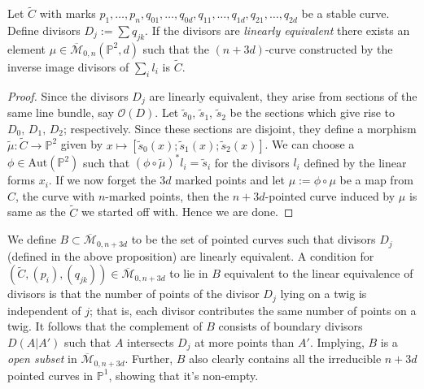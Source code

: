 \begin{proposition}
    Let $\tilde{C}$ with marks $p_{1},\allowbreak \dots,\allowbreak p_{n},\allowbreak q_{01},\allowbreak \dots,\allowbreak q_{0d} ,\allowbreak q_{11},\allowbreak \dots,\allowbreak q_{1d},\allowbreak q_{21},\allowbreak \dots,\allowbreak q_{2d}$ be a stable curve.
    Define divisors $D_{j}:= \sum q_{jk}$.
    If the divisors are \textit{linearly equivalent} there exists an element $\mu \in \overline{\mathcal{M}}_{0,n}(\mathbb{P}^{2},d)$ such that the $(n+3d)$-curve constructed by the inverse image divisors of $\sum_{i}l_{i}$ is $\tilde{C}$.
\end{proposition}
\begin{proof}
    Since the divisors $D_{j}$ are linearly equivalent, they arise from sections of the same line bundle, say $\mathcal{O}(D)$.
    Let $\tilde{s}_{0},\, \tilde{s}_{1},\,\tilde{s}_{2}$ be the sections which give rise to $D_{0},\,\allowbreak D_{1},\,\allowbreak D_{2}$; respectively.
    Since these sections are disjoint, they define a morphism $\tilde{\mu}: \tilde C \to \mathbb{P}^{2}$ given by $x \mapsto [\tilde{s}_{0}(x);\tilde{s}_{1}(x);\tilde{s}_{2}(x)]$.
    We can choose a $\phi \in \text{Aut}(\mathbb{P}^{2})$ such that $(\phi \circ \tilde{\mu})^{*}l_{i} = \tilde{s}_{i}$ for the divisors $l_{i}$ defined by the linear forms $x_{i}$.
    If we now forget the $3d$ marked points and let $\mu := \phi \circ \mu$ be a map from $C$, the curve with $n$-marked points, then the $n+3d$-pointed curve induced by $\mu$ is same as the $\tilde{C}$ we started off with.
    Hence we are done.
\end{proof}

\begin{remark}
    We define $B \subset \overline{\mathcal{M}}_{0,n+3d}$ to be the set of pointed curves such that divisors $D_{j}$ (defined in the above proposition) are linearly equivalent. 
    A condition for $(\tilde C, (p_{i}), (q_{jk})) \in \overline{\mathcal{M}}_{0,n+3d}$ to lie in $B$ equivalent to the linear equivalence of divisors is that the number of points of the divisor $D_{j}$ lying on a twig is independent of $j$; that is, each divisor contributes the same number of points on a twig.
    It follows that the complement of $B$ consists of boundary divisors $D(A|A')$ such that $A$ intersects $D_{j}$ at more points than $A'$. Implying, $B$ is a \textit{open subset} in $\overline{\mathcal{M}}_{0,n+3d}$.
    Further, $B$ also clearly contains all the irreducible $n+3d$ pointed curves in $\mathbb{P}^{1}$, showing that it's non-empty.
\end{remark}

